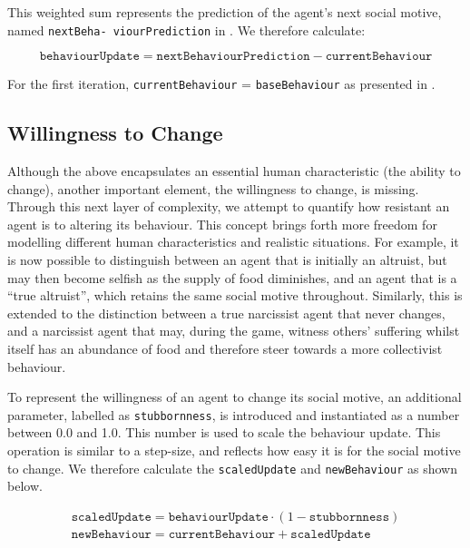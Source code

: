 This weighted sum represents the prediction of the agent's next social motive, named \texttt{nextBeha- viourPrediction} in . We therefore calculate:

\begin{equation}
    \texttt{behaviourUpdate} = \texttt{nextBehaviourPrediction} - \texttt{currentBehaviour}
\end{equation}


For the first iteration, \texttt{currentBehaviour} = \texttt{baseBehaviour} as presented in .

\subsection{Willingness to Change}\label{willingness_to_change}
Although the above encapsulates an essential human characteristic (the ability to change), another important element, the willingness to change, is missing. Through this next layer of complexity, we attempt to quantify how resistant an agent is to altering its behaviour. This concept brings forth more freedom for modelling different human characteristics and realistic situations. For example, it is now possible to distinguish between an agent that is initially an altruist, but may then become selfish as the supply of food diminishes, and an agent that is a “true altruist”, which retains the same social motive throughout. Similarly, this is extended to the distinction between a true narcissist agent that never changes, and a narcissist agent that may, during the game, witness others' suffering whilst itself has an abundance of food and therefore steer towards a more collectivist behaviour.

To represent the willingness of an agent to change its social motive, an additional parameter, labelled as \texttt{stubbornness}, is introduced and instantiated as a number between 0.0 and 1.0. This number is used to scale the behaviour update. This operation is similar to a step-size, and reflects how easy it is for the social motive to change. We therefore calculate the \texttt{scaledUpdate} and \texttt{newBehaviour} as shown below.


\begin{equation}
    \begin{gathered}
    \texttt{scaledUpdate} = \texttt{behaviourUpdate} \cdot (1-\texttt{stubbornness}) \\
    \texttt{newBehaviour} = \texttt{currentBehaviour} + \texttt{scaledUpdate}
    \end{gathered}
\end{equation}


